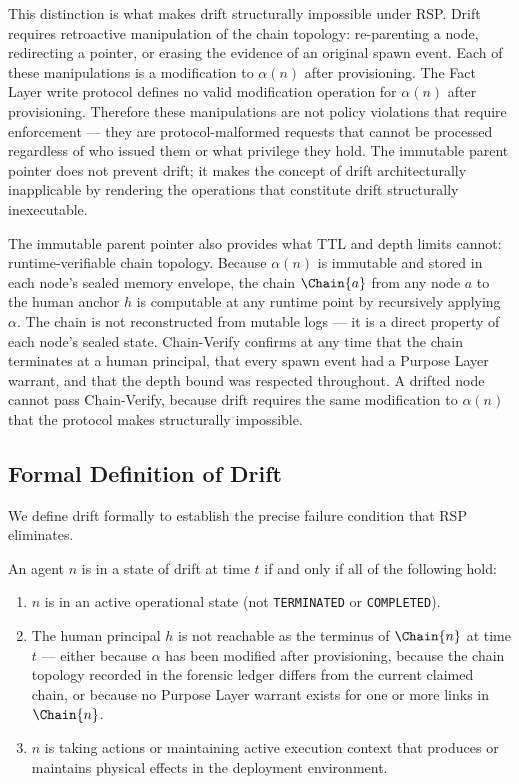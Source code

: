 This distinction is what makes drift structurally impossible under RSP. Drift requires retroactive manipulation of the chain topology: re-parenting a node, redirecting a pointer, or erasing the evidence of an original spawn event. Each of these manipulations is a modification to $\alpha(n)$ after provisioning. The Fact Layer write protocol defines no valid modification operation for $\alpha(n)$ after provisioning. Therefore these manipulations are not policy violations that require enforcement — they are protocol-malformed requests that cannot be processed regardless of who issued them or what privilege they hold. The immutable parent pointer does not prevent drift; it makes the concept of drift architecturally inapplicable by rendering the operations that constitute drift structurally inexecutable.

The immutable parent pointer also provides what TTL and depth limits cannot: runtime-verifiable chain topology. Because $\alpha(n)$ is immutable and stored in each node's sealed memory envelope, the chain $\Chain{a}$ from any node $a$ to the human anchor $h$ is computable at any runtime point by recursively applying $\alpha$. The chain is not reconstructed from mutable logs — it is a direct property of each node's sealed state. Chain-Verify confirms at any time that the chain terminates at a human principal, that every spawn event had a Purpose Layer warrant, and that the depth bound was respected throughout. A drifted node cannot pass Chain-Verify, because drift requires the same modification to $\alpha(n)$ that the protocol makes structurally impossible.

\subsection{Formal Definition of Drift}
\label{sec:drift-definition}

We define drift formally to establish the precise failure condition that RSP eliminates.

\begin{dfn}[Drift]
\label{dfn:drift}
An agent $n$ is in a state of drift at time $t$ if and only if all of the following hold:

\begin{enumerate}
    \item[(D1)] $n$ is in an active operational state (not \texttt{TERMINATED} or \texttt{COMPLETED}).
    \item[(D2)] The human principal $h$ is not reachable as the terminus of $\Chain{n}$ at time $t$ — either because $\alpha$ has been modified after provisioning, because the chain topology recorded in the forensic ledger differs from the current claimed chain, or because no Purpose Layer warrant exists for one or more links in $\Chain{n}$.
    \item[(D3)] $n$ is taking actions or maintaining active execution context that produces or maintains physical effects in the deployment environment.
\end{enumerate}
\end{dfn}

